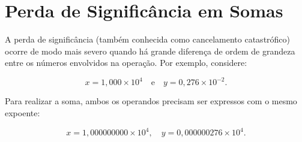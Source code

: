 \section{Perda de Significância em Somas}
A perda de significância (também conhecida como cancelamento catastrófico) ocorre de modo mais severo quando há grande diferença de ordem de grandeza entre os números envolvidos na operação. Por exemplo, considere:

\[
x = 1{,}000 \times 10^{4} \quad \text{e} \quad y = 0{,}276 \times 10^{-2}.
\]

Para realizar a soma, ambos os operandos precisam ser expressos com o mesmo expoente:

\[
x = 1{,}000000000 \times 10^4, \quad y = 0{,}000000276 \times 10^4.
\]

